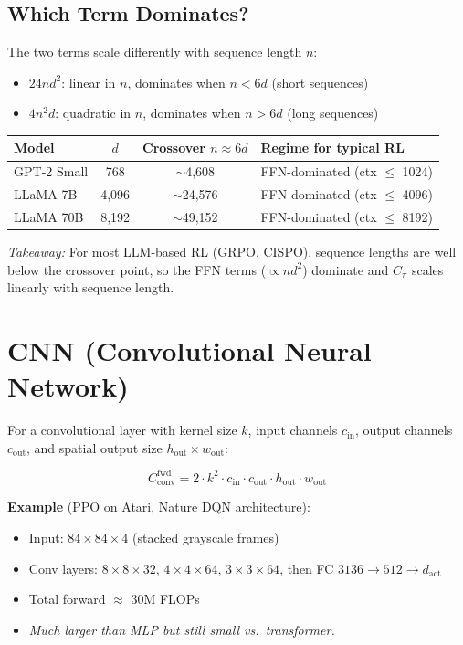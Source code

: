 \documentclass[11pt]{article}
\begin{document}
\subsection{Which Term Dominates?}

The two terms scale differently with sequence length $n$:
\begin{itemize}[nosep]
\item $24nd^2$: linear in $n$, dominates when $n < 6d$ (short sequences)
\item $4n^2 d$: quadratic in $n$, dominates when $n > 6d$ (long sequences)
\end{itemize}

\begin{center}
\renewcommand{\arraystretch}{1.3}
\begin{tabular}{lccl}
\toprule
\textbf{Model} & $d$ & \textbf{Crossover} $n \approx 6d$ & \textbf{Regime for typical RL} \\
\midrule
GPT-2 Small & 768 & $\sim$4,608 & FFN-dominated (ctx $\leq$ 1024) \\
LLaMA 7B & 4,096 & $\sim$24,576 & FFN-dominated (ctx $\leq$ 4096) \\
LLaMA 70B & 8,192 & $\sim$49,152 & FFN-dominated (ctx $\leq$ 8192) \\
\bottomrule
\end{tabular}
\end{center}

\textit{Takeaway:} For most LLM-based RL (GRPO, CISPO), sequence lengths are well below the crossover point, so the FFN terms ($\propto nd^2$) dominate and $C_\pi$ scales linearly with sequence length.

\section{CNN (Convolutional Neural Network)}

For a convolutional layer with kernel size $k$, input channels $c_{\text{in}}$, output channels $c_{\text{out}}$, and spatial output size $h_{\text{out}} \times w_{\text{out}}$:

\[
C_{\text{conv}}^{\text{fwd}} = 2 \cdot k^2 \cdot c_{\text{in}} \cdot c_{\text{out}} \cdot h_{\text{out}} \cdot w_{\text{out}}
\]

\textbf{Example} (PPO on Atari, Nature DQN architecture):
\begin{itemize}[nosep]
\item Input: $84 \times 84 \times 4$ (stacked grayscale frames)
\item Conv layers: $8{\times}8{\times}32$, $4{\times}4{\times}64$, $3{\times}3{\times}64$, then FC $3136 \to 512 \to d_{\text{act}}$
\item Total forward $\approx$ 30M FLOPs
\item \textit{Much larger than MLP but still small vs.\ transformer.}
\end{itemize}
\end{document}
